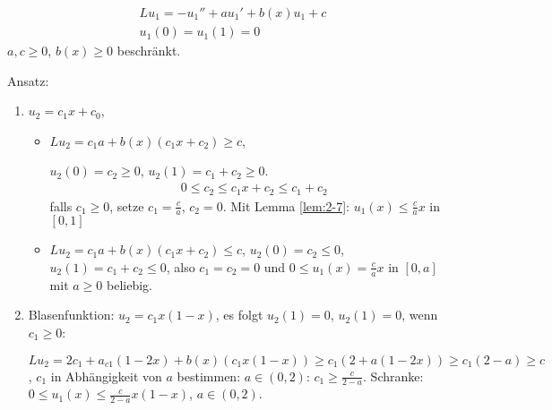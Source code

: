 \begin{beispiel}
  \begin{align*}
    Lu_{1} = -u_{1}'' + au_{1}' + b(x)u_{1} + c\\
    u_{1}(0) = u_{1}(1) = 0
  \end{align*}
$a, c \geq 0$, $b(x) \geq 0$ beschränkt. 

Ansatz:
\begin{enumerate}
\item $u_{2} = c_{1}x + c_{0}$,
  \begin{itemize}
  \item $Lu_{2} = c_{1} a + b(x)(c_{1}x + c_{2})\geq c$,

$u_{2}(0) = c_{2} \geq 0$, $u_{2}(1) = c_{1} + c_{2} \geq 0$.
\begin{align*}
  0 \leq c_{2} \leq c_{1}x + c_{2}\leq c_{1} + c_{2}
\end{align*}
falls $c_{1}\geq 0$, setze $c_{1} = \frac ca$, $c_{2} = 0$. 
Mit Lemma \ref{lem:2-7}: $u_{1}(x) \leq \frac c a x$ in $[0, 1]$
\item $Lu_{2} = c_{1} a + b(x)(c_{1}x + c_{2})\leq c$, 
$u_{2}(0) = c_{2} \leq 0$, $u_{2}(1) = c_{1} + c_{2} \leq 0$, also $c_{1} = c_{2} = 0$ und $0\leq u_{1}(x) = \frac c a x$ in $[0, a]$ mit $a \geq 0$ beliebig. 
  \end{itemize}
\item Blasenfunktion: $u_{2} = c_{1}x (1 - x)$, es folgt $u_{2}(1) = 0$, $u_{2}(1) = 0$, 
wenn $c_{1} \geq 0$:

$Lu_{2} = 2c_{1} + a_{c1}(1 - 2x) + b(x)(c_{1}x(1-x))\geq c_{1}(2 + a(1-2x))\geq c_{1}(2 - a)\geq c$, 
$c_{1}$ in Abhängigkeit von $a$ bestimmen: 
$a \in (0, 2)$: $c_{1} \geq \frac c {2-a}$. Schranke: $0 \leq u_{1}(x) \leq \frac c{2-a} x(1 - x)$, $a \in (0, 2)$. 
\end{enumerate}
\end{beispiel}

